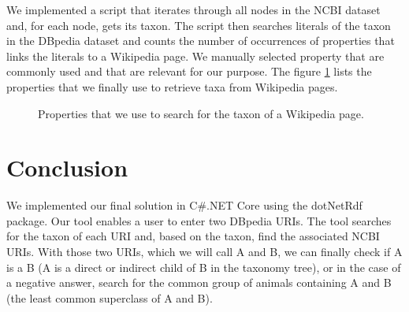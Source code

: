 \documentclass{article}
\begin{document}
	We implemented a script that iterates through all nodes in the NCBI dataset and, for each node, gets its taxon. The script then searches literals of the taxon in the DBpedia dataset and counts the number of occurrences of properties that links the literals to a Wikipedia page. We manually selected property that are commonly used and that are relevant for our purpose. The figure \ref{lst:taxon_properties} lists the properties that we finally use to retrieve taxa from Wikipedia pages.
	
	\begin{figure}[h]
		
		\caption{Properties that we use to search for the taxon of a Wikipedia page.}
		\label{lst:taxon_properties}
	\end{figure}
	
	\section{Conclusion}
	
	We implemented our final solution in C\#.NET Core using the dotNetRdf package. Our tool enables a user to enter two DBpedia URIs. The tool searches for the taxon of each URI and, based on the taxon, find the associated NCBI URIs. With those two URIs, which we will call A and B, we can finally check if A is a B (A is a direct or indirect child of B in the taxonomy tree), or in the case of a negative answer, search for the common group of animals containing A and B (the least common superclass of A and B).
	
	
\end{document}
